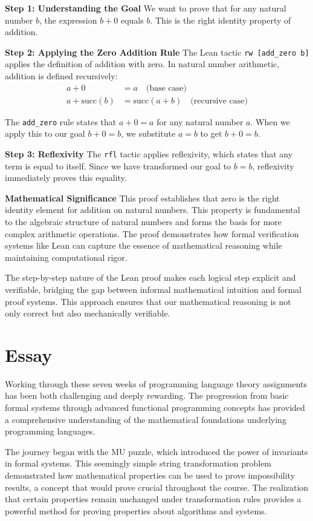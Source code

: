 \documentclass{article}
\theoremstyle{plain}
\theoremstyle{definition}
\theoremstyle{remark}
\begin{document}
\textbf{Step 1: Understanding the Goal}
We want to prove that for any natural number $b$, the expression $b + 0$ equals $b$. This is the right identity property of addition.

\textbf{Step 2: Applying the Zero Addition Rule}
The Lean tactic \texttt{rw [add\_zero b]} applies the definition of addition with zero. In natural number arithmetic, addition is defined recursively:
\begin{align}
a + 0 &= a \quad \text{(base case)} \\
a + \text{succ}(b) &= \text{succ}(a + b) \quad \text{(recursive case)}
\end{align}

The \texttt{add\_zero} rule states that $a + 0 = a$ for any natural number $a$. When we apply this to our goal $b + 0 = b$, we substitute $a = b$ to get $b + 0 = b$.

\textbf{Step 3: Reflexivity}
The \texttt{rfl} tactic applies reflexivity, which states that any term is equal to itself. Since we have transformed our goal to $b = b$, reflexivity immediately proves this equality.

\textbf{Mathematical Significance}
This proof establishes that zero is the right identity element for addition on natural numbers. This property is fundamental to the algebraic structure of natural numbers and forms the basis for more complex arithmetic operations. The proof demonstrates how formal verification systems like Lean can capture the essence of mathematical reasoning while maintaining computational rigor.

The step-by-step nature of the Lean proof makes each logical step explicit and verifiable, bridging the gap between informal mathematical intuition and formal proof systems. This approach ensures that our mathematical reasoning is not only correct but also mechanically verifiable.

\section{Essay}

Working through these seven weeks of programming language theory assignments has been both challenging and deeply rewarding. The progression from basic formal systems through advanced functional programming concepts has provided a comprehensive understanding of the mathematical foundations underlying programming languages.

The journey began with the MU puzzle, which introduced the power of invariants in formal systems. This seemingly simple string transformation problem demonstrated how mathematical properties can be used to prove impossibility results, a concept that would prove crucial throughout the course. The realization that certain properties remain unchanged under transformation rules provides a powerful method for proving properties about algorithms and systems.
\end{document}
